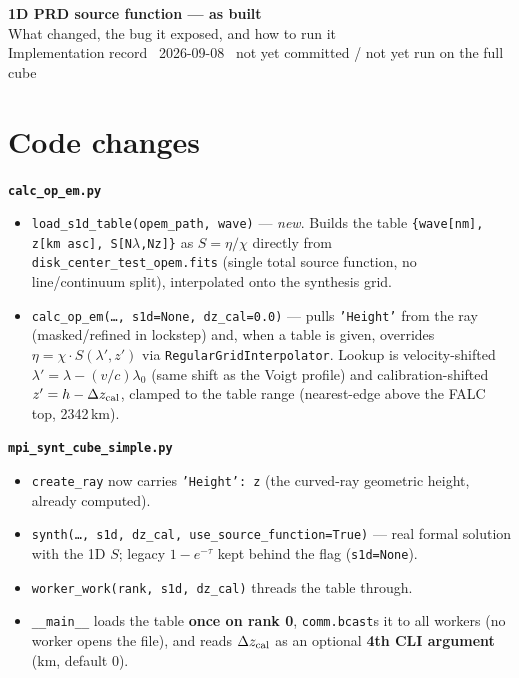 \documentclass[10pt]{article}
\newcommand{\code}[1]{\texttt{\small #1}}
\begin{document}
\begin{center}
  {\LARGE\bfseries 1D PRD source function --- as built}\\[2pt]
  {\large\color{accent} What changed, the bug it exposed, and how to run it}\\[2pt]
  {\small Implementation record \textperiodcentered\ 2026-09-08 \textperiodcentered\ not yet committed / not yet run on the full cube}
\end{center}

\section{Code changes}
\textbf{\code{calc\_op\_em.py}}
\begin{itemize}
  \item \code{load\_s1d\_table(opem\_path, wave)} --- \emph{new}. Builds the table
    \code{\{wave[nm], z[km asc], S[N$\lambda$,Nz]\}} as $S=\eta/\chi$ directly from
    \code{disk\_center\_test\_opem.fits} (single total source function, no
    line/continuum split), interpolated onto the synthesis grid.
  \item \code{calc\_op\_em(\dots, s1d=None, dz\_cal=0.0)} --- pulls \code{'Height'}
    from the ray (masked/refined in lockstep) and, when a table is given, overrides
    $\eta=\chi\cdot S(\lambda',z')$ via \code{RegularGridInterpolator}. Lookup is
    velocity-shifted $\lambda'=\lambda-(v/c)\lambda_0$ (same shift as the Voigt
    profile) and calibration-shifted $z'=h-\Delta z_{\rm cal}$, clamped to the
    table range (nearest-edge above the FALC top, 2342\,km).
\end{itemize}
\textbf{\code{mpi\_synt\_cube\_simple.py}}
\begin{itemize}
  \item \code{create\_ray} now carries \code{'Height': z} (the curved-ray
    geometric height, already computed).
  \item \code{synth(\dots, s1d, dz\_cal, use\_source\_function=True)} --- real
    formal solution with the 1D $S$; legacy $1-e^{-\tau}$ kept behind the flag
    (\code{s1d=None}).
  \item \code{worker\_work(rank, s1d, dz\_cal)} threads the table through.
  \item \code{\_\_main\_\_} loads the table \textbf{once on rank 0},
    \code{comm.bcast}s it to all workers (no worker opens the file), and reads
    $\Delta z_{\rm cal}$ as an optional \textbf{4th CLI argument} (km, default 0).
\end{itemize}
\end{document}
